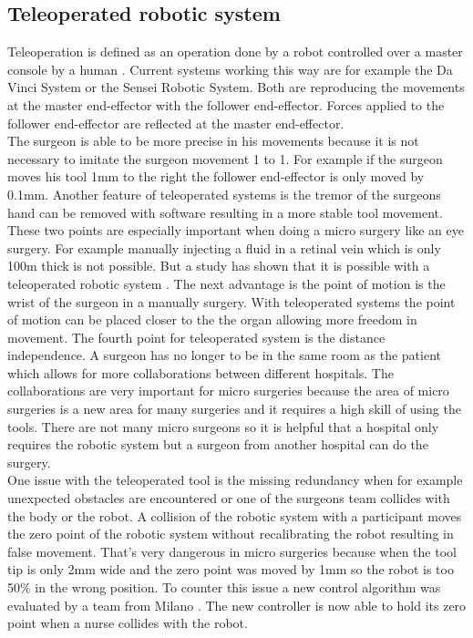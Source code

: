 \subsection{Teleoperated robotic system}
\label{sec:teleoperation}
Teleoperation is defined as an operation done by a robot controlled over a master console by a human \cite{definition_teleoperation}.  Current systems working this way are for example the Da Vinci System or the Sensei Robotic System. Both are reproducing the  movements at the master end-effector with the follower end-effector. Forces applied to the follower end-effector are reflected at the master end-effector. \\
The surgeon is able to be more precise in his movements because it is not necessary to imitate the surgeon movement 1 to 1. For example if the surgeon moves his tool 1mm to the right the follower end-effector is only moved by 0.1mm. Another feature of teleoperated systems is the tremor of the surgeons hand can be removed with software resulting in a more stable tool movement. These two points are especially important when doing a micro surgery like an eye surgery. For example manually injecting a fluid in a retinal vein which is only 100\textmu m thick is not possible. But a study has shown that it is possible with a teleoperated robotic system \cite{veincannulation}. The next advantage is the point of motion is the wrist of the surgeon in a manually surgery. With teleoperated systems the point of motion can be placed closer to the the organ allowing more freedom in movement.  The fourth point for teleoperated system is the distance independence. A surgeon has no longer to be in the same room as the patient which allows for more collaborations between different hospitals. The collaborations are very important for micro surgeries because the area of micro surgeries is a new area for many surgeries and it requires a high skill of using the tools. There are not many micro surgeons so it is helpful that a hospital only requires the robotic system but a surgeon from another hospital can do the surgery. \\
One issue with the teleoperated tool is the missing redundancy when for example unexpected obstacles are encountered or one of the surgeons team collides with the body or the robot. A collision of the robotic system with a participant moves the zero point of the robotic system without recalibrating the robot resulting in false movement. That's very dangerous in micro surgeries because when the tool tip is only 2mm wide and the zero point was moved by 1mm so the robot is too 50\% in the wrong position. To counter this issue a new control algorithm was evaluated by a team from Milano \cite{redudancy_teleoperation}. The new controller is now able to hold its zero point when a nurse collides with the robot.\\
